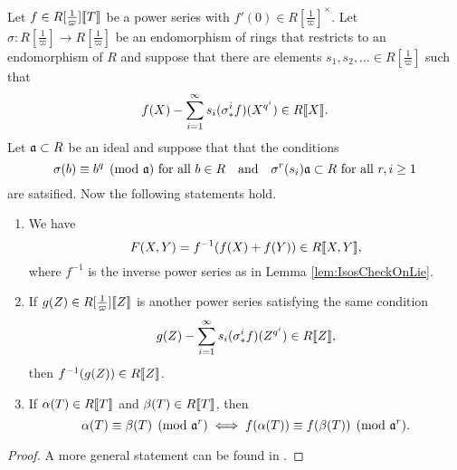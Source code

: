 \documentclass[../main.tex]{subfiles}
\begin{document}
\begin{thm}\label{thm:HazewinkelIntegrality}
  Let $f \in R[\tfrac 1\varpi]\llbracket T \rrbracket$ be a 
  power series with $f'(0) \in R[\tfrac 1\varpi]^\times$. Let 
  $\sigma\colon  R[\tfrac 1\varpi] \to R[\tfrac 1\varpi]$ be an endomorphism
  of rings that restricts to an endomorphism of $R$ and suppose that 
  there are elements $s_1, s_2, \dots \in R[\tfrac 1\varpi]$ such that
  \begin{equation*}
    f(X) - \sum_{i=1}^\infty s_i (\sigma^i_* f)(X^{q^i}) \in R\llbracket X \rrbracket.
  \end{equation*}
  Let $\mathfrak{a} \subset R$ be an ideal and suppose that that the conditions
  \begin{equation*}
    \sigma(b) \equiv b^q \pmod {\mathfrak{a}} \text{ for all } b \in R \quad \text{and} \quad 
    \sigma^r(s_i) \mathfrak{a} \subset R \text{ for all } r,i \geq 1
  \end{equation*}
  are satsified. Now the following statements hold.
  \begin{enumerate}
    \item We have 
        \begin{equation*}
          F(X,Y) = f^{-1}(f(X) + f(Y)) \in R \llbracket X,Y \rrbracket,
        \end{equation*}
        where $f^{-1}$ is the inverse power series as in Lemma \ref{lem:IsosCheckOnLie}.
    \item If $g(Z) \in R[\tfrac 1\varpi]\llbracket Z \rrbracket$ is another power series
        satisfying the same condition
        \begin{equation*}
          g(Z) - \sum_{i=1}^\infty s_i (\sigma^i_* f)(Z^{q^i}) \in R\llbracket Z \rrbracket,
        \end{equation*}
        then $f^{-1}(g(Z)) \in R\llbracket Z \rrbracket$. 
    \item If $\alpha(T) \in R\llbracket T \rrbracket$ and $\beta(T) \in R \llbracket T \rrbracket$, then
        \begin{equation} \label{eq:funceqlemcongruence}
          \alpha(T) \equiv \beta(T) \pmod {\mathfrak{a}^r} \iff f(\alpha(T)) \equiv f(\beta(T))
          \pmod {\mathfrak{a}^r}.
        \end{equation}
  \end{enumerate}
\end{thm}
  \begin{proof}
    A more general statement can be found in \cite[Sections 2 and
    10]{hazewinkel1978formal}.
  \end{proof}
\end{document}
